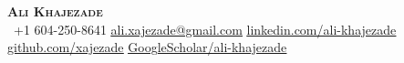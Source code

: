 \begin{center}
    \textbf{\Huge \scshape Ali Khajezade} \\ \vspace{1pt}
     \ \small +1 604-250-8641 \quad
    \href{mailto:ali.xajezade@gmail.com}{ \underline{ali.xajezade@gmail.com}} \quad
    \href{https://www.linkedin.com/in/ali-khajezade-b5ab415b}{ \underline{linkedin.com/ali-khajezade}} \quad
    \href{https://github.com/xajezade}{ \underline{github.com/xajezade}}
    \href{https://scholar.google.com/citations?user=Jid40ogAAAAJ&hl=en&oi=ao}{ \underline{GoogleScholar/ali-khajezade}}    
\end{center}